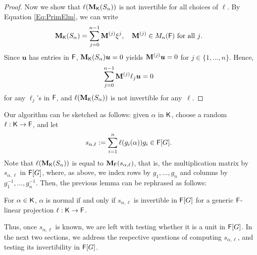 \begin{proof}
  Now we show that $\ell(\mat M_\K(S_\alpha))$ is not invertible for all
  choices of $\ell$. By Equation \eqref{Eq:PrimElm}, we can write
  $$\mat M_\K(S_\alpha) = \sum_{j = 0}^{n-1} \mat M^{(j)} \xbar^j, \quad 
  \mat M^{(j)} \in M_{n}(\F) \text{~for all $j$}.$$ 
  Since $\boldsymbol{u}$ has entries in ${\mathsf{F}}$,
  $\mat M_\K(S_\alpha) \boldsymbol{u} =0$ yields
  $\mat M^{(j)}\boldsymbol{u} = 0$ for
  $j \in \lbrace 1, \ldots , n \rbrace$. Hence,
$$\sum_{j = 0}^{n-1} \mat M^{(j)} \ell_j \boldsymbol{u} = 0$$ for any 
$\ell_j$'s in ${\mathsf{F}}$, and $\ell(\mat M_\K(S_\alpha))$ is not invertible for any~$\ell$.
\end{proof} 
Our algorithm can be sketched as follows: given $\alpha$ in ${\mathsf{K}}$,
choose a random $\ell: {\mathsf{K}}\to{\mathsf{F}}$, and let
\begin{equation}\label{def:s_alpha_ell}
s_{\alpha,\ell}:=\sum_{i=1}^n \ell(g_i(\alpha))g_i \in {\mathsf{F}}[G].
\end{equation}
Note that $\ell(\mat M_\K(S_\alpha))$ is equal to $\mat
M_\F(s_{\alpha,\ell})$, that is, the multiplication matrix by
$s_{\alpha,\ell}$ in ${\mathsf{F}}[G]$, where, as above, we index rows by
$g_1,\dots,g_n$ and columns by $g_1^{-1},\dots,g_n^{-1}$.  Then,
the previous lemma can be rephrased as follows:
\begin{lemma}
  \label{Lem:Proj-bis}
  For $\alpha \in {\mathsf{K}}$, $\alpha$ is normal if and only if
  $s_{\alpha,\ell}$ is invertible in ${\mathsf{F}}[G]$ for a generic
  ${\mathsf{F}}$-linear projection $\ell: {\mathsf{K}} \to {\mathsf{F}}$.
\end{lemma}
Thus, once $s_{\alpha,\ell}$ is known, we are left with testing
whether it is a unit in ${\mathsf{F}}[G]$. In the next two sections, we address
the respective questions of computing $s_{\alpha,\ell}$, and testing
its invertibility in ${\mathsf{F}}[G]$.


